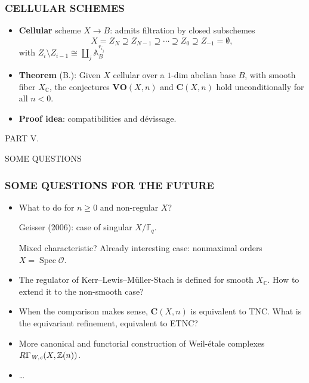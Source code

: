 \documentclass[handout]{beamer}
\newcommand{\CC}{\mathbb{C}}
\newcommand{\FF}{\mathbb{F}}
\newcommand{\ZZ}{\mathbb{Z}}
\renewcommand{\AA}{\mathbb{A}}
\DeclareMathOperator{\Spec}{Spec}
\newcommand{\Wc}{\text{\it W,c}}
\begin{document}

\begin{frame}
  \frametitle{CELLULAR SCHEMES}

  \begin{itemize}
  \item<2-> \textbf{Cellular} scheme $X \to B$: admits filtration by closed
    subschemes
    \[ X = Z_N \supseteq Z_{N-1} \supseteq \cdots \supseteq Z_0 \supseteq Z_{-1} = \emptyset, \]
    with $Z_i\setminus Z_{i-1} \cong \coprod_j \AA^{r_{i_j}}_B$

  \item<3-> \textbf{Theorem} (B.): Given $X$ cellular over a $1$-dim abelian
    base $B$, with smooth fiber $X_\CC$, the conjectures $\mathbf{VO} (X,n)$ and
    $\mathbf{C} (X,n)$ hold unconditionally for all $n < 0$.

  \item<4-> \textbf{Proof idea}: compatibilities and dévissage.
  \end{itemize}
\end{frame}


\begin{frame}[plain]
  \headingfont

  \begin{center}
    {\huge PART V.

      \vspace{1em}

      SOME QUESTIONS}
  \end{center}
\end{frame}


\begin{frame}
  \frametitle{SOME QUESTIONS FOR THE FUTURE}

  \begin{itemize}
  \item<2-> What to do for $n \ge 0$ and non-regular $X$?

    Geisser (2006): case of singular $X/\FF_q$.

    Mixed characteristic? Already interesting case: nonmaximal orders $X = \Spec \mathcal{O}$.

  \item<3-> The regulator of Kerr--Lewis--Müller-Stach is defined for smooth
    $X_\CC$.
    How to extend it to the non-smooth case?

  \item<4-> When the comparison makes sense, $\mathbf{C} (X,n)$ is equivalent to
    TNC.
    What is the equivariant refinement, equivalent to ETNC?

  \item<5-> More canonical and functorial construction of Weil-étale complexes
    $R\Gamma_\Wc (X, \ZZ(n))$.

  \item<6-> \dots
  \end{itemize}
\end{frame}
\end{document}

